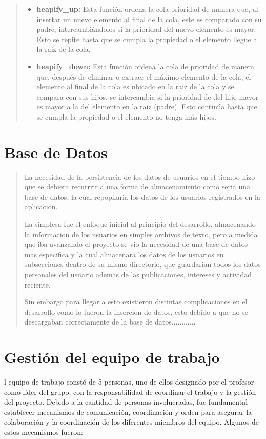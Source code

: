 \documentclass[9pt,letterpaper,onecolumn]{rho-class/rho}
\begin{document}
\begin{quote}
	\begin{itemize}
		\item \textbf{heapify\_up:} Esta función ordena la cola prioridad de manera que, al insertar un nuevo elemento al final de la cola, este es comparado con su padre, intercambiándolos si la prioridad del nuevo elemento es mayor. Esto se repite hasta que se cumpla la propiedad o el elemento llegue a la raiz de la cola.
		\item \textbf{heapify\_down:} Esta función ordena la cola de prioridad de manera que, después de eliminar o extraer el máximo elemento de la cola, el elemento al final de la cola es ubicado en la raiz de la cola y se compara con sus hijos, se intercambia si la prioridad de del hijo mayor es mayor a la del elemento en la raiz (padre). Esto continúa hasta que se cumpla la propiedad o el elemento no tenga más hijos.
	\end{itemize}
\end{quote}

\newpage
\section{Base de Datos}
\begin{quote}
	La necesidad de la persistencia de los datos de usuarios en el tiempo hizo que se debiera recurrrir a una forma de almacenamiento como seria una base de datos, la cual repopilaria los datos de los usuarios registrados en la aplicacion.
	
	La simplesa fue el enfoque inicial al principio del desarrollo, almacenando la informacion de los usuarios en simples archivos de texto, pero a medida que iba avanzando el proyecto se vio la necesidad de una base de datos mas especifica y la cual almacenara los datos de los usuarios en subsecciones dentro de su mismo directorio, que guardarian todos los datos personales del usuario ademas de las publicaciones, intereses y actividad reciente.
	
	Sin embargo para llegar a esto existieron distintas complicaciones en el desarrollo como lo fueron la insercion de datos, esto debido a que no se descargaban correctamente de la base de datos............
\end{quote}

\newpage
\section{Gestión del equipo de trabajo}
l equipo de trabajo constó de 5 personas, uno de ellos designado por el profesor como líder del grupo, con la responsabilidad de coordinar el trabajo y la gestión del proyecto. Debido a la cantidad de personas involucradas, fue fundamental establecer mecanismos de comunicación, coordinación y orden para asegurar la colaboración y la coordinación de los diferentes miembros del equipo. Algunos de estos mecanismos fueron:
\end{document}

